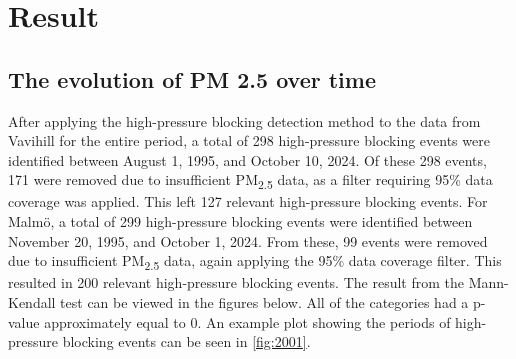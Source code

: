 \newpage
\section{Result}
\subsection{The evolution of PM 2.5 over time}

After applying the high-pressure blocking detection method to the data from Vavihill for the entire period, a total of 298 high-pressure blocking events were identified between August 1, 1995, and October 10, 2024. Of these 298 events, 171 were removed due to insufficient PM\textsubscript{2.5} data, as a filter requiring 95\% data coverage was applied. This left 127 relevant high-pressure blocking events. For Malmö, a total of 299 high-pressure blocking events were identified between November 20, 1995, and October 1, 2024. From these, 99 events were removed due to insufficient PM\textsubscript{2.5} data, again applying the 95\% data coverage filter. This resulted in 200 relevant high-pressure blocking events. The result from the Mann-Kendall test can be viewed in the figures below. All of the categories had a p-value approximately equal to 0. An example plot showing the periods of high-pressure blocking events can be seen in \autoref{fig:2001}.


